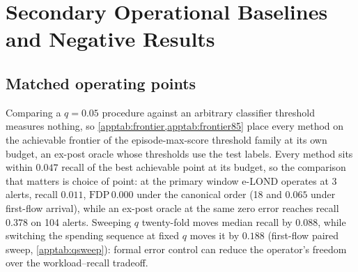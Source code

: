 \documentclass[conference]{IEEEtran}
\newcommand{\FDP}{\mathrm{FDP}}
\begin{document}
\section{Secondary Operational Baselines and Negative Results}\label{app:baselines}\label{app:negative}

\subsection{Matched operating points}

Comparing a $q=0.05$ procedure against an arbitrary classifier threshold measures nothing, so
\cref{apptab:frontier,apptab:frontier85} place every method on the achievable frontier of the
episode-max-score threshold family at its own budget, an ex-post oracle whose thresholds use the test
labels. Every method sits within $0.047$ recall of the best achievable point at its budget, so the
comparison that matters is choice of point: at the primary window e-LOND operates at 3 alerts, recall
$0.011$, $\FDP\,0.000$ under the canonical order (18 and $0.065$ under first-flow arrival), while an
ex-post oracle at the same zero error reaches recall $0.378$ on 104 alerts. Sweeping $q$ twenty-fold
moves median recall by $0.088$, while switching the spending sequence at fixed $q$ moves it by $0.188$
(first-flow paired sweep, \cref{apptab:qsweep}): formal error control can reduce the operator's freedom
over the workload--recall tradeoff.
\end{document}
